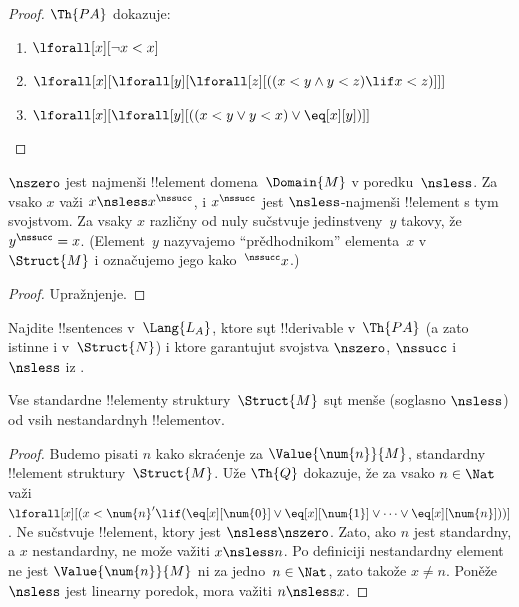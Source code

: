 \documentclass[../../../include/open-logic-section]{subfiles}
\begin{document}
\begin{proof}
$\Th{PA}$ dokazuje:
\begin{enumerate}
\item $\lforall[x][\lnot x < x]$
\item $\lforall[x][\lforall[y][\lforall[z][((x < y \land y < z) \lif x < z)]]]$
\item $\lforall[x][\lforall[y][((x < y \lor y < x) \lor \eq[x][y])]]$
\end{enumerate}
\end{proof}

\begin{prop}
 $\nszero$ jest najmenši !!{element}
domena~$\Domain{M}$ v poredku~$\nsless$. Za vsako $x$ važi $x \nsless
x^\nssucc$, i $x^\nssucc$ jest $\nsless$-najmenši !!{element} s tym
svojstvom. Za vsaky $x$ različny od nuly sučstvuje jedinstveny~$y$
takovy, že $y^\nssucc = x$. (Element~$y$ nazyvajemo
``prědhodnikom'' elementa~$x$ v~$\Struct{M}$ i označujemo jego
kako~$^\nssucc x$.)
\end{prop}

\begin{proof}
Upražnjenje.
\end{proof}

\begin{prob}
Najdite !!{sentence}s v~$\Lang{L_A}$, ktore sųt !!{derivable}
v~$\Th{PA}$ (a zato istinne i v~$\Struct{N}$) i ktore garantujut
svojstva $\nszero$, $\nssucc$ i $\nsless$ iz
.
\end{prob}

\begin{prop}
Vse standardne !!{element}y struktury~$\Struct{M}$ sųt menše (soglasno
$\nsless$) od vsih nestandardnyh !!{element}ov.
\end{prop}

\begin{proof}
Budemo pisati $n$ kako skraćenje za $\Value{\num{n}}{M}$, standardny
!!{element} struktury~$\Struct{M}$. Uže $\Th{Q}$ dokazuje, že za vsako
$n \in \Nat$ važi $\lforall[x][(x < \num{n}' \lif
(\eq[x][\num{0}] \lor \eq[x][\num{1}] \lor \dots \lor
\eq[x][\num{n}]))]$. Ne sučstvuje !!{element}, ktory jest $\nsless
\nszero$. Zato, ako $n$ jest standardny, a $x$ nestandardny, ne može
važiti $x \nsless n$. Po definiciji nestandardny element ne jest
$\Value{\num{n}}{M}$ ni za jedno~$n \in \Nat$, zato takože $x \neq n$.
Poněže $\nsless$ jest linearny poredok, mora važiti $n \nsless x$.
\end{proof}
\end{document}
